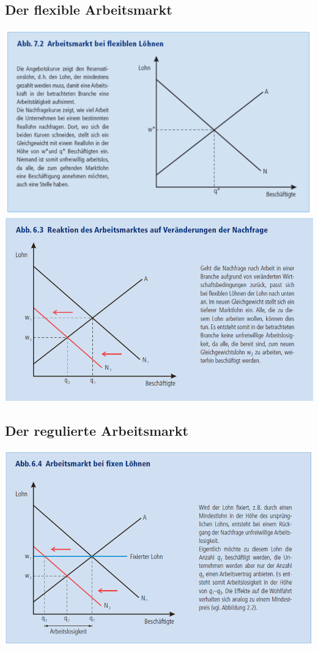 \subsection{Der flexible Arbeitsmarkt}
\begin{multicols}{2}
	\includegraphics[width=\linewidth]{images/felxibellohne.png}
	\includegraphics[width=\linewidth]{images/flexibellohne2.png}
\end{multicols}
\subsection{Der regulierte Arbeitsmarkt}
	\includegraphics[width=0.8\linewidth]{images/fixelohne.png}

